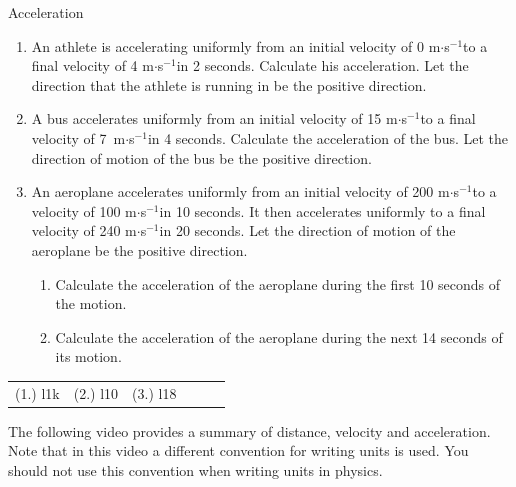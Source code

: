 \label{m38794*secfhsst!!!underscore!!!id1815}
\begin{exercises}{Acceleration }
            \nopagebreak \noindent
      \label{m38794*id62523}\begin{enumerate}[noitemsep, label=\textbf{\arabic*}. ] 
            \label{m38794*uid78}\item An athlete is accelerating uniformly from an initial velocity of 0 m$\ensuremath{\cdot}$s${}^{-1}$to a final velocity of 4 m$\ensuremath{\cdot}$s${}^{-1}$in 2 seconds. Calculate his acceleration. Let the direction that the athlete is running in be the positive direction.
\label{m38794*uid79}\item A bus accelerates uniformly from an initial velocity of 15 m$\ensuremath{\cdot}$s${}^{-1}$to a final velocity of 7~m$\ensuremath{\cdot}$s${}^{-1}$in 4 seconds. Calculate the acceleration of the bus. Let the direction of motion of the bus be the positive direction.
\label{m38794*uid80}\item An aeroplane accelerates uniformly from an initial velocity of 200 m$\ensuremath{\cdot}$s${}^{-1}$to a velocity of 100 m$\ensuremath{\cdot}$s${}^{-1}$in 10 seconds. It then accelerates uniformly to a final velocity of 240 m$\ensuremath{\cdot}$s${}^{-1}$in 20 seconds. Let the direction of motion of the aeroplane be the positive direction.
\label{m38794*id68889}\begin{enumerate}[noitemsep, label=\textbf{\alph*}. ] 
            \label{m38794*uid81}\item Calculate the acceleration of the aeroplane during the first 10 seconds of the motion.
\label{m38794*uid82}\item Calculate the acceleration of the aeroplane during the next 14 seconds of its motion.
\end{enumerate}
                \end{enumerate}
  \label{m38794**end}
\par \practiceinfo
 \par \begin{tabular}[h]{cccccc}
 (1.) l1k  &  (2.) l10  &  (3.) l18  & \end{tabular}
\end{exercises}
\label{m38794*eip-307}The following video provides a summary of distance, velocity and acceleration. Note that in this video a different convention for writing units is used. You should not use this convention when writing units in physics.

\nopagebreak
